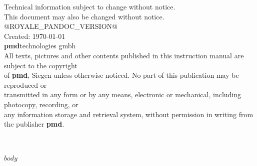 \documentclass[11pt,oneside]{article}
\begin{document}
\vspace*{\fill}
\small{
Technical information subject to change without notice.\\
This document may also be changed without notice.\\
@ROYALE_PANDOC_VERSION@ \\
Created:  \indent \today\\
\textcopyright \textbf{pmd}technologies gmbh\\
All texts, pictures and other contents published in this instruction manual are subject to the copyright\\
of \textbf{pmd}, Siegen unless otherwise noticed. No part of this publication may be reproduced or\\
transmitted in any form or by any means, electronic or mechanical, including photocopy, recording, or\\
any information storage and retrieval system, without permission in writing from the publisher \textbf{pmd}.}\\\\\\

\cleardoublepage

\setcounter{page}{3}
\tableofcontents

\cleardoublepage

$body$

\cleardoublepage
\printindex
\end{document}
